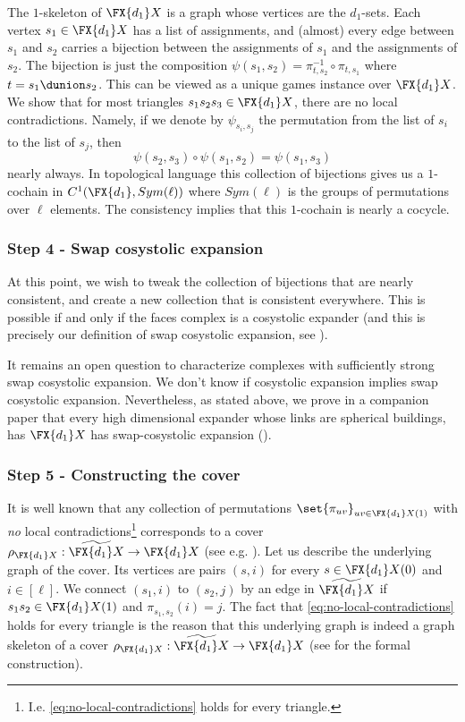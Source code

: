 \documentclass{article}[11pt]
\begin{document}
The $1$-skeleton of $\FX{d_1}X$ is a graph whose vertices are the $d_1$-sets. Each vertex $s_1 \in \FX{d_1}X$ has a list of assignments, and (almost) every edge between $s_1$ and $s_2$ carries a bijection between the assignments of $s_1$ and the assignments of $s_2$. The bijection is just the composition \(\psi(s_1,s_2) = \pi_{t,s_2}^{-1} \circ \pi_{t,s_1}\) where \(t=s_1 \dunion s_2\). This can be viewed as a unique games instance over $\FX{d_1}X$. We show that for most triangles $s_1 s_2 s_3\in \FX{d_1}X$, there are no local contradictions. Namely, if we denote by $\psi_{s_i,s_j}$ the permutation from the list of $s_i$ to the list of $s_j$, then 
    \begin{equation} \label{eq:no-local-contradictions}
        \psi(s_2, s_3)\circ \psi(s_1, s_2)=\psi(s_1, s_3)
    \end{equation}
nearly always. In topological language this collection of bijections gives us a $1$-cochain in $C^1(\FX{d_1},Sym(\ell))$ where $Sym(\ell)$ is the groups of permutations over $\ell$ elements. The consistency implies that this $1$-cochain is nearly a cocycle.

\subsubsection*{Step 4 - Swap cosystolic expansion}
At this point, we wish to tweak the collection of bijections that are nearly consistent, and create a new collection that is consistent everywhere. This is possible if and only if the faces complex is a cosystolic expander (and this is precisely our definition of swap cosystolic expansion, see ). 

It remains an open question to characterize complexes with sufficiently strong swap cosystolic expansion. We don't know if cosystolic expansion implies swap cosystolic expansion. Nevertheless, as stated above, we prove in a companion paper \cite{DiksteinD2023b} that every high dimensional expander whose links are spherical buildings, has \(\FX{d_1}X\) has swap-cosystolic expansion ().  

\subsubsection*{Step 5 - Constructing the cover}
It is well known that any collection of permutations \(\set{\pi_{uv}}_{uv \in \FX{d_1}X(1)}\) with \emph{no} local contradictions\footnote{I.e. \eqref{eq:no-local-contradictions} holds for every triangle.} corresponds to a cover \(\rho_{\FX{d_1}X}:\widetilde{\FX{d_1}X} \to \FX{d_1}X\) (see e.g. \cite{Surowski1984}). Let us describe the underlying graph of the cover. Its vertices are pairs \((s,i)\) for every \(s \in \FX{d_1}X(0)\) and \(i \in [\ell]\). We connect \((s_1,i)\) to \((s_2,j)\) by an edge in \(\widetilde{\FX{d_1}X}\) if \(s_1 s_2 \in \FX{d_1}X(1)\) and \(\pi_{s_1,s_2}(i)=j\). The fact that \eqref{eq:no-local-contradictions} holds for every triangle is the reason that this underlying graph is indeed a graph skeleton of a cover \(\rho_{\FX{d_1}X}:\widetilde{\FX{d_1}X} \to \FX{d_1}X\) (see  for the formal construction).
    
\end{document}
